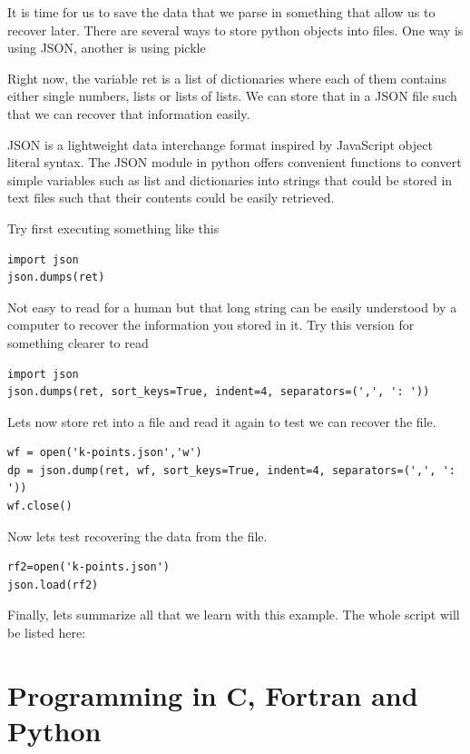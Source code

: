 It is time for us to save the data that we parse in something that allow us to recover later. There are several ways to store python objects into files. One way is using JSON, another is using pickle

Right now, the variable ret is a list of dictionaries where each of them contains either single numbers, lists or lists of lists. We can store that in a JSON file such that we can recover that information easily.

JSON is a lightweight data interchange format inspired by JavaScript object literal syntax.
The JSON module in python offers convenient functions to convert simple variables such as list and dictionaries into strings that could be stored in text files such that their contents could be easily retrieved.

Try first executing something like this

\begin{lstlisting}
import json
json.dumps(ret)
\end{lstlisting}

Not easy to read for a human but that long string can be easily understood by a computer to recover the information you stored in it. Try this version for something clearer to read

\begin{lstlisting}
import json
json.dumps(ret, sort_keys=True, indent=4, separators=(',', ': '))
\end{lstlisting}

Lets now store ret into a file and read it again to test we can recover the file.

\begin{lstlisting}
wf = open('k-points.json','w')
dp = json.dump(ret, wf, sort_keys=True, indent=4, separators=(',', ': '))
wf.close()
\end{lstlisting}

Now lets test recovering the data from the file.

\begin{lstlisting}
rf2=open('k-points.json')
json.load(rf2)
\end{lstlisting}

Finally, lets summarize all that we learn with this example.
The whole script will be listed here:



\section{Programming in C, Fortran and Python}

